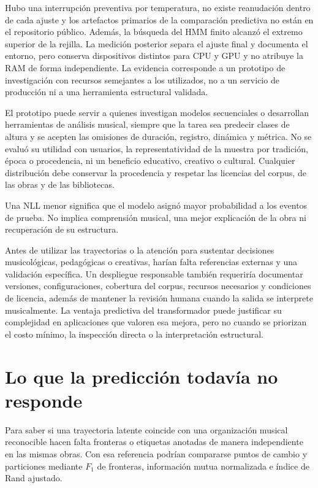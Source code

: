 Hubo una interrupción preventiva por temperatura, no existe reanudación dentro de cada ajuste y los artefactos primarios de la comparación predictiva no están en el repositorio público. Además, la búsqueda del HMM finito alcanzó el extremo superior de la rejilla. La medición posterior separa el ajuste final y documenta el entorno, pero conserva dispositivos distintos para CPU y GPU y no atribuye la RAM de forma independiente. La evidencia corresponde a un prototipo de investigación con recursos semejantes a los utilizados, no a un servicio de producción ni a una herramienta estructural validada.

El prototipo puede servir a quienes investigan modelos secuenciales o desarrollan herramientas de análisis musical, siempre que la tarea sea predecir clases de altura y se acepten las omisiones de duración, registro, dinámica y métrica. No se evaluó su utilidad con usuarios, la representatividad de la muestra por tradición, época o procedencia, ni un beneficio educativo, creativo o cultural. Cualquier distribución debe conservar la procedencia y respetar las licencias del corpus, de las obras y de las bibliotecas.

Una NLL menor significa que el modelo asignó mayor probabilidad a los eventos de prueba. No implica comprensión musical, una mejor explicación de la obra ni recuperación de su estructura.

Antes de utilizar las trayectorias o la atención para sustentar decisiones musicológicas, pedagógicas o creativas, harían falta referencias externas y una validación específica. Un despliegue responsable también requeriría documentar versiones, configuraciones, cobertura del corpus, recursos necesarios y condiciones de licencia, además de mantener la revisión humana cuando la salida se interprete musicalmente. La ventaja predictiva del transformador puede justificar su complejidad en aplicaciones que valoren esa mejora, pero no cuando se priorizan el costo mínimo, la inspección directa o la interpretación estructural.

\section{Lo que la predicción todavía no responde}

Para saber si una trayectoria latente coincide con una organización musical reconocible hacen falta fronteras o etiquetas anotadas de manera independiente en las mismas obras. Con esa referencia podrían compararse puntos de cambio y particiones mediante $F_1$ de fronteras, información mutua normalizada e índice de Rand ajustado.

